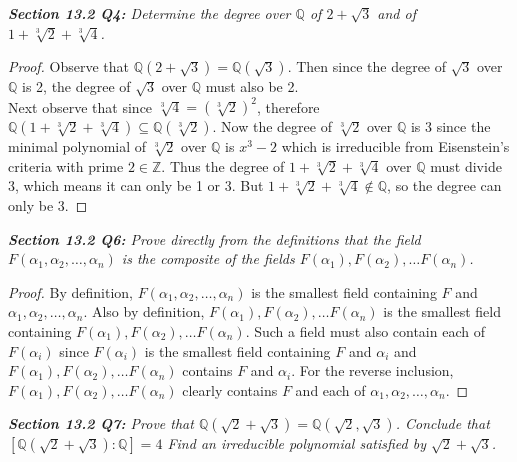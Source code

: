 \documentclass{article}
\begin{document}
\it \textbf{Section 13.2 Q4:} Determine the degree over $\mathbb{Q}$ of
  $2+\sqrt{3}$ and of $1+\sqrt[3]{2}+\sqrt[3]{4}$.

  \begin{proof}
    Observe that $\mathbb{Q}(2+\sqrt{3}) =\mathbb{Q}(\sqrt{3})$. Then since
    the degree of $\sqrt{3}$ over $\mathbb{Q}$ is 2, the degree of
    $\sqrt{3}$ over $\mathbb{Q}$ must also be 2. \\

    Next observe that since $\sqrt[3]{4}=(\sqrt[3]{2})^2$, therefore
    $\mathbb{Q}(1+\sqrt[3]{2}+\sqrt[3]{4})\subseteq
    \mathbb{Q}(\sqrt[3]{2})$. Now the degree of $\sqrt[3]{2}$ over
    $\mathbb{Q}$ is 3 since the minimal polynomial of $\sqrt[3]{2}$ over
    $\mathbb{Q}$ is $x^3-2$ which is irreducible from Eisenstein's criteria
    with prime $2\in\mathbb{Z}$. Thus the degree of
    $1+\sqrt[3]{2}+\sqrt[3]{4}$ over $\mathbb{Q}$ must divide 3, which
    means it can only be 1 or 3. But
    $1+\sqrt[3]{2}+\sqrt[3]{4}\not\in\mathbb{Q}$, so the degree can only be
    3.
  \end{proof}

\it \textbf{Section 13.2 Q6:} Prove directly from the definitions that the
  field $F(\alpha_1,\alpha_2,\ldots,\alpha_n)$ is the composite of the
  fields $F(\alpha_1),F(\alpha_2),\ldots F(\alpha_n)$.

  \begin{proof}
    By definition, $F(\alpha_1,\alpha_2,\ldots,\alpha_n)$ is the smallest
    field containing $F$ and $\alpha_1,\alpha_2,\ldots,\alpha_n$. Also by
    definition, $F(\alpha_1),F(\alpha_2),\ldots F(\alpha_n)$ is the
    smallest field containing $F(\alpha_1),F(\alpha_2),\ldots F(\alpha_n)$.
    Such a field must also contain each of $F(\alpha_i)$ since
    $F(\alpha_i)$ is the smallest field containing $F$ and $\alpha_i$ and
    $F(\alpha_1),F(\alpha_2),\ldots F(\alpha_n)$ contains $F$ and
    $\alpha_i$. For the reverse inclusion, $F(\alpha_1),F(\alpha_2),\ldots
    F(\alpha_n)$ clearly contains $F$ and each of
    $\alpha_1,\alpha_2,\ldots,\alpha_n$.
  \end{proof}

\it \textbf{Section 13.2 Q7:} Prove that $\mathbb{Q}(\sqrt{2}+\sqrt{3})
  =\mathbb{Q}(\sqrt{2},\sqrt{3})$. Conclude that
  $[\mathbb{Q}(\sqrt{2}+\sqrt{3}):\mathbb{Q}]=4$ Find an irreducible
  polynomial satisfied by $\sqrt{2}+\sqrt{3}$.
\end{document}
